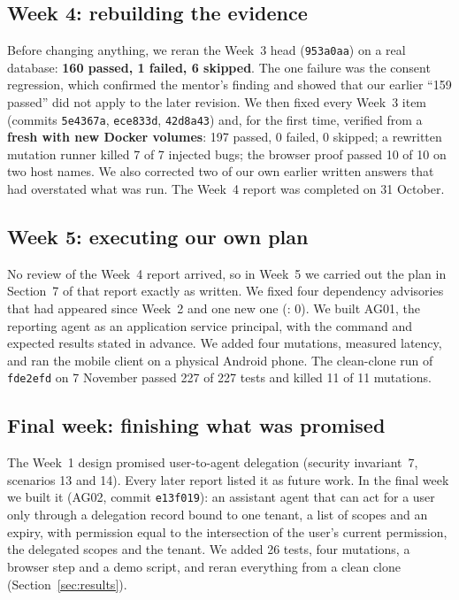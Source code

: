 \subsection{Week 4: rebuilding the evidence}
Before changing anything, we reran the Week~3 head (\texttt{953a0aa}) on a real database: \textbf{160 passed, 1 failed, 6 skipped}. The one failure was the consent regression, which confirmed the mentor's finding and showed that our earlier ``159 passed'' did not apply to the later revision. We then fixed every Week~3 item (commits \texttt{5e4367a}, \texttt{ece833d}, \texttt{42d8a43}) and, for the first time, verified from a \textbf{fresh  with new Docker volumes}: 197 passed, 0 failed, 0 skipped; a rewritten mutation runner killed 7 of 7 injected bugs; the browser proof passed 10 of 10 on two host names. We also corrected two of our own earlier written answers that had overstated what was run. The Week~4 report was completed on 31 October.

\subsection{Week 5: executing our own plan}
No review of the Week~4 report arrived, so in Week~5 we carried out the plan in Section~7 of that report exactly as written. We fixed four dependency advisories that had appeared since Week~2 and one new one (: 0). We built AG01, the reporting agent as an application service principal, with the command and expected results stated in advance. We added four mutations, measured latency, and ran the mobile client on a physical Android phone. The clean-clone run of \texttt{fde2efd} on 7 November passed 227 of 227 tests and killed 11 of 11 mutations.

\subsection{Final week: finishing what was promised}
The Week~1 design promised user-to-agent delegation (security invariant~7, scenarios 13 and 14). Every later report listed it as future work. In the final week we built it (AG02, commit \texttt{e13f019}): an assistant agent that can act for a user only through a delegation record bound to one tenant, a list of scopes and an expiry, with permission equal to the intersection of the user's current permission, the delegated scopes and the tenant. We added 26 tests, four mutations, a browser step and a demo script, and reran everything from a clean clone (Section~\ref{sec:results}).

